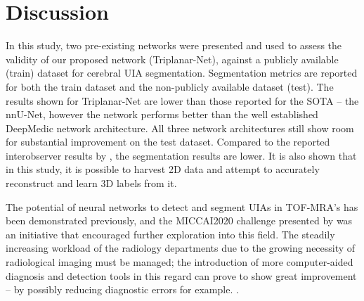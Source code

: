 \chapter{Discussion}
\label{chapter7}

In this study, two pre-existing networks were presented and used to assess the validity of our proposed network (Triplanar-Net), against a publicly available (train) dataset for cerebral UIA segmentation. Segmentation metrics are reported for both the train dataset and the non-publicly available dataset (test). The results shown for Triplanar-Net are lower than those reported for the SOTA -- the nnU-Net, however the network performs better than the well established DeepMedic network architecture. All three network architectures still show room for substantial improvement on the test dataset. Compared to the reported interobserver results by \citeauthor{Timmins2020}, the segmentation results are lower. It is also shown that in this study, it is possible to harvest 2D data and attempt to accurately reconstruct and learn 3D labels from it. 

The potential of neural networks to detect and segment UIAs in TOF-MRA's has been demonstrated previously, and the MICCAI2020 challenge presented by \citeauthor{Timmins2020} was an initiative that encouraged further exploration into this field. The steadily increasing workload of the radiology departments due to the growing necessity of radiological imaging must be managed; the introduction of more computer-aided diagnosis and detection tools in this regard can prove to show great improvement -- by possibly reducing diagnostic errors for example. .

